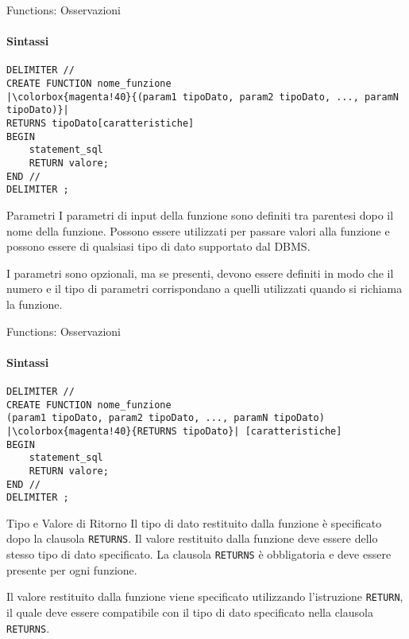 \begin{frame}[fragile]{Functions: Osservazioni}
\framesubtitle{Sintassi}
\vspace{-.9cm}
\begin{lstlisting}
DELIMITER //
CREATE FUNCTION nome_funzione
|\colorbox{magenta!40}{(param1 tipoDato, param2 tipoDato, ..., paramN tipoDato)}|
RETURNS tipoDato[caratteristiche]
BEGIN
    statement_sql
    RETURN valore;
END //
DELIMITER ;
\end{lstlisting}

\vspace{-.4cm}

\begin{minipage}{\textwidth}
    \small \begin{block}{Parametri}
    I parametri di input della funzione sono definiti tra parentesi dopo il nome della funzione.
    Possono essere utilizzati per passare valori alla funzione e possono essere di qualsiasi tipo di dato supportato dal DBMS.
    
    I parametri sono opzionali, ma se presenti, devono essere definiti in modo che il numero e il tipo di parametri corrispondano a quelli utilizzati quando si richiama la funzione.
    \end{block}
    \end{minipage}
\end{frame}
%
\begin{frame}[fragile]{Functions: Osservazioni}
\framesubtitle{Sintassi}
\vspace{-.9cm}
\begin{lstlisting}
DELIMITER //
CREATE FUNCTION nome_funzione
(param1 tipoDato, param2 tipoDato, ..., paramN tipoDato)
|\colorbox{magenta!40}{RETURNS tipoDato}| [caratteristiche]
BEGIN
    statement_sql
    RETURN valore;
END //
DELIMITER ;
\end{lstlisting}

\vspace{-.4cm}

\begin{minipage}{\textwidth}
    \small
    \begin{block}{Tipo e Valore di Ritorno}
    Il tipo di dato restituito dalla funzione \`e specificato dopo la clausola \texttt{RETURNS}.
    Il valore restituito dalla funzione deve essere dello stesso tipo di dato specificato.
    La clausola \texttt{RETURNS} \`e obbligatoria e deve essere presente per ogni funzione.
    
    Il valore restituito dalla funzione viene specificato utilizzando l'istruzione \texttt{RETURN}, il quale deve essere compatibile con il tipo di dato specificato nella clausola \texttt{RETURNS}.
    \end{block}
    \end{minipage}
\end{frame}
